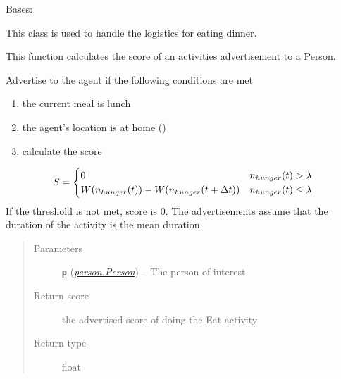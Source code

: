 \documentclass[letterpaper,10pt,english]{sphinxmanual}
\begin{document}

\begin{fulllineitems}
\label{eat:eat.Eat_Dinner}
Bases: {\hyperref[eat:eat.Eat]{\emph{}}}

This class is used to handle the logistics for eating dinner.

\begin{fulllineitems}
\label{eat:eat.Eat_Dinner.advertise}
This function calculates the score of an activities advertisement to a Person.

Advertise to the agent if the following conditions are met
\begin{enumerate}
\item {} 
the current meal is lunch

\item {} 
the agent's location is at home ()

\item {} 
calculate the score

\end{enumerate}
\begin{gather}
\begin{split}S = \begin{cases}
0  & n_{hunger}(t) > \lambda \\
W( n_{hunger}(t) ) - W( n_{hunger}(t + \Delta{t} )) & n_{hunger}(t) \le \lambda
\end{cases}\end{split}\notag
\end{gather}
If the threshold is not met, score is 0. The advertisements assume that the duration         of the activity is the mean duration.
\begin{quote}\begin{description}
\item[{Parameters}] \leavevmode
\textbf{\texttt{p}} ({\hyperref[person:person.Person]{\emph{\emph{person.Person}}}}) -- The person of interest

\item[{Return score}] \leavevmode
the advertised score of doing the Eat activity

\item[{Return type}] \leavevmode
float

\end{description}\end{quote}


\end{fulllineitems}
\end{fulllineitems}
\end{document}
